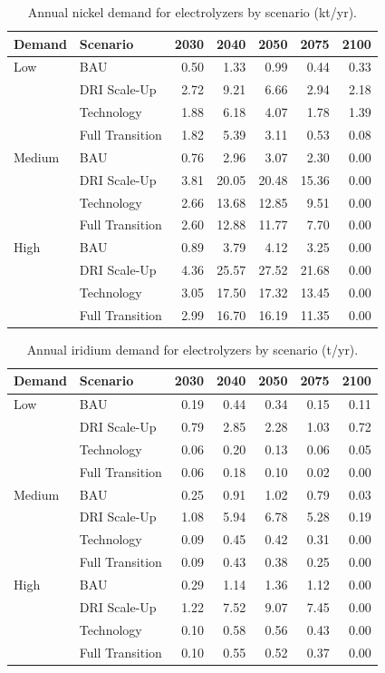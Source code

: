 \begin{table}[h!]
\centering
\small
\caption{Annual nickel demand for electrolyzers by scenario (kt/yr).}
\label{tab:app_nickel}
\begin{tabular}{llrrrrr}
\toprule
Demand & Scenario & 2030 & 2040 & 2050 & 2075 & 2100 \\
\midrule
Low & BAU & 0.50 & 1.33 & 0.99 & 0.44 & 0.33 \\
 & DRI Scale-Up & 2.72 & 9.21 & 6.66 & 2.94 & 2.18 \\
 & Technology & 1.88 & 6.18 & 4.07 & 1.78 & 1.39 \\
 & Full Transition & 1.82 & 5.39 & 3.11 & 0.53 & 0.08 \\
\midrule
Medium & BAU & 0.76 & 2.96 & 3.07 & 2.30 & 0.00 \\
 & DRI Scale-Up & 3.81 & 20.05 & 20.48 & 15.36 & 0.00 \\
 & Technology & 2.66 & 13.68 & 12.85 & 9.51 & 0.00 \\
 & Full Transition & 2.60 & 12.88 & 11.77 & 7.70 & 0.00 \\
\midrule
High & BAU & 0.89 & 3.79 & 4.12 & 3.25 & 0.00 \\
 & DRI Scale-Up & 4.36 & 25.57 & 27.52 & 21.68 & 0.00 \\
 & Technology & 3.05 & 17.50 & 17.32 & 13.45 & 0.00 \\
 & Full Transition & 2.99 & 16.70 & 16.19 & 11.35 & 0.00 \\
\bottomrule
\end{tabular}
\end{table}


\begin{table}[h!]
\centering
\small
\caption{Annual iridium demand for electrolyzers by scenario (t/yr).}
\label{tab:app_iridium}
\begin{tabular}{llrrrrr}
\toprule
Demand & Scenario & 2030 & 2040 & 2050 & 2075 & 2100 \\
\midrule
Low & BAU & 0.19 & 0.44 & 0.34 & 0.15 & 0.11 \\
 & DRI Scale-Up & 0.79 & 2.85 & 2.28 & 1.03 & 0.72 \\
 & Technology & 0.06 & 0.20 & 0.13 & 0.06 & 0.05 \\
 & Full Transition & 0.06 & 0.18 & 0.10 & 0.02 & 0.00 \\
\midrule
Medium & BAU & 0.25 & 0.91 & 1.02 & 0.79 & 0.03 \\
 & DRI Scale-Up & 1.08 & 5.94 & 6.78 & 5.28 & 0.19 \\
 & Technology & 0.09 & 0.45 & 0.42 & 0.31 & 0.00 \\
 & Full Transition & 0.09 & 0.43 & 0.38 & 0.25 & 0.00 \\
\midrule
High & BAU & 0.29 & 1.14 & 1.36 & 1.12 & 0.00 \\
 & DRI Scale-Up & 1.22 & 7.52 & 9.07 & 7.45 & 0.00 \\
 & Technology & 0.10 & 0.58 & 0.56 & 0.43 & 0.00 \\
 & Full Transition & 0.10 & 0.55 & 0.52 & 0.37 & 0.00 \\
\bottomrule
\end{tabular}
\end{table}


